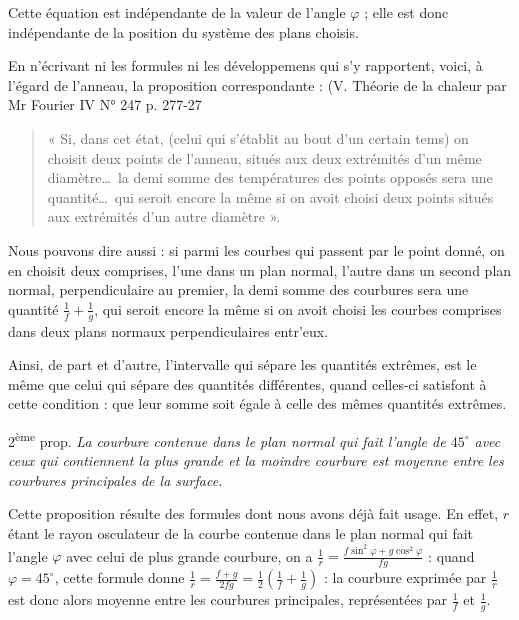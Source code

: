 \documentclass[11pt,a4paper]{article}
\begin{document}
Cette équation est indépendante de la valeur de l'angle $\varphi$ ; elle est
donc indépendante de la position du système des plans choisis.

En n'écrivant ni les formules ni les développemens qui s'y rapportent, voici,
à l'égard de l'anneau, la proposition correspondante : (V. Théorie de la
chaleur par Mr Fourier \ill{} IV N° 247 p. 277-27\ill{}


\begin{quote}
« Si, dans cet état, (celui qui s'établit au bout d'un certain tems) on
choisit deux points de l'anneau, situés aux deux extrémités d'un même
diamètre\ldots\ la demi somme des températures des points opposés sera une
quantité\ldots\ qui seroit encore la même si on avoit choisi deux points
situés aux extrémités d'un autre diamètre ».
\end{quote}

Nous pouvons dire aussi : si parmi les courbes qui passent par le point
donné, on en choisit deux comprises, l'une dans un  plan
normal, l'autre dans un second plan normal, perpendiculaire au premier, la
demi somme des courbures sera une quantité $\frac{1}{f} + \frac{1}{g}$, qui
seroit encore la même si on avoit choisi les courbes comprises dans deux
 plans normaux perpendiculaires entr'eux.

Ainsi, de part et d'autre, l'intervalle qui sépare les quantités extrêmes,
est le même que celui qui sépare des quantités différentes, quand celles-ci
satisfont à cette condition : que leur somme soit égale à celle des mêmes
quantités extrêmes.

2\textsuperscript{ème} prop. \emph{La courbure contenue dans le plan normal
qui fait l'angle de $45^{\circ}$ avec ceux qui contiennent la plus grande et
la moindre courbure est moyenne entre les courbures principales de la
surface.}

Cette proposition résulte des formules dont nous avons déjà fait usage. En
effet, $r$ étant le rayon osculateur de la courbe contenue dans le plan
normal qui fait l'angle $\varphi$ avec celui de plus grande courbure, on a
$\frac{1}{r} = \frac{f\sin^{2}\varphi + g\cos^{2}\varphi}{fg}$ : quand
$\varphi = 45^{\circ}$, cette formule donne
$\frac{1}{r} = \frac{f+g}{2fg} = \frac{1}{2}\left(\frac{1}{f} +
\frac{1}{g}\right)$ : la courbure exprimée par $\frac{1}{r}$ est donc alors
moyenne entre les courbures principales, représentées par $\frac{1}{f}$ et
$\frac{1}{g}$.
\end{document}
